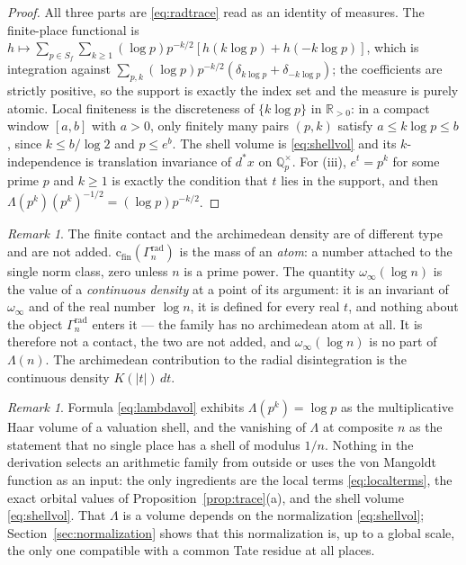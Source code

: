 \documentclass[11pt]{amsart}
\theoremstyle{definition}
\theoremstyle{remark}
\newtheorem{remark}[theorem]{Remark}
\newcommand{\R}{\mathbb R}
\newcommand{\Q}{\mathbb Q}
\newcommand{\cfin}{\mathrm{c}_{\mathrm{fin}}}
\begin{document}
\begin{proof}
All three parts are \eqref{eq:radtrace} read as an identity of measures. The
finite-place functional is
$h\mapsto\sum_{p\in S_f}\sum_{k\ge1}(\log p)p^{-k/2}[h(k\log p)+h(-k\log p)]$,
which is integration against
$\sum_{p,k}(\log p)p^{-k/2}(\delta_{k\log p}+\delta_{-k\log p})$; the
coefficients are strictly positive, so the support is exactly the index set and
the measure is purely atomic. Local finiteness is the discreteness of
$\{k\log p\}$ in $\R_{>0}$: in a compact window $[a,b]$ with $a>0$, only
finitely many pairs $(p,k)$ satisfy $a\le k\log p\le b$, since
$k\le b/\log2$ and $p\le e^b$. The shell volume is \eqref{eq:shellvol} and its
$k$-independence is translation invariance of $d^*x$ on $\Q_p^\times$. For
(iii), $e^t=p^k$ for some prime $p$ and $k\ge1$ is exactly the condition that
$t$ lies in the support, and then $\Lambda(p^k)(p^k)^{-1/2}=(\log p)p^{-k/2}$.
\end{proof}

\begin{remark}\label{rem:typesdiffer}
The finite contact and the archimedean density are of different type and are
not added. $\cfin(\Gamma_n^{\mathrm{rad}})$ is the mass of an \emph{atom}: a
number attached to the single norm class, zero unless $n$ is a prime power.
The quantity $\omega_\infty(\log n)$ is the value of a \emph{continuous
density} at a point of its argument: it is an invariant of $\omega_\infty$ and
of the real number $\log n$, it is defined for every real $t$, and nothing
about the object $\Gamma_n^{\mathrm{rad}}$ enters it --- the family has no
archimedean atom at all.  It is therefore not a contact, the two are not
added, and $\omega_\infty(\log n)$ is no part of $\Lambda(n)$.  The archimedean
contribution to the radial disintegration is the continuous density
$K(|t|)\,dt$.
\end{remark}

\begin{remark}\label{rem:lambdaderived}
Formula \eqref{eq:lambdavol} exhibits $\Lambda(p^k)=\log p$ as the
multiplicative Haar volume of a valuation shell, and the
vanishing of $\Lambda$ at composite $n$ as the statement that no single place
has a shell of modulus $1/n$. Nothing in the derivation selects an arithmetic
family from outside or uses the von Mangoldt function as an input: the only
ingredients are the local terms \eqref{eq:localterms}, the exact orbital values
of Proposition~\ref{prop:trace}(a), and the shell volume \eqref{eq:shellvol}.
That $\Lambda$ is a volume depends on the normalization \eqref{eq:shellvol};
Section~\ref{sec:normalization} shows that this normalization is, up to a
global scale, the only one compatible with a common Tate residue at all
places.
\end{remark}
\end{document}
